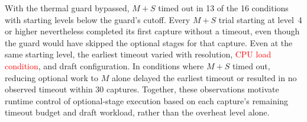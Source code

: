 

With the thermal guard bypassed, \(M+S\) timed out in 13 of the 16 conditions with starting levels below the guard's cutoff.
Every \(M+S\) trial starting at level~4 or higher nevertheless completed its first capture without a timeout, even though the guard would have skipped the optional stages for that capture.
Even at the same starting level, the earliest timeout varied with resolution, \textcolor{red}{CPU load condition}, and draft configuration.
In conditions where \(M+S\) timed out, reducing optional work to \(M\) alone delayed the earliest timeout or resulted in no observed timeout within 30 captures.
Together, these observations motivate runtime control of optional-stage execution based on each capture's remaining timeout budget and draft workload, rather than the overheat level alone.
